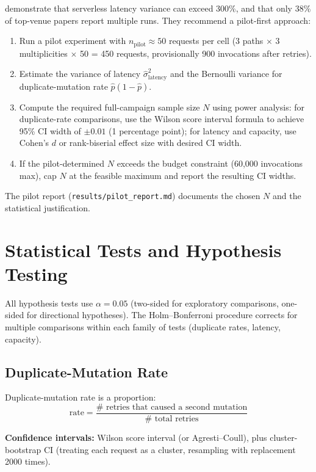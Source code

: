 \citet{Wen2025Variance} demonstrate that serverless latency variance can exceed 300\%, and that only 38\% of top-venue papers report multiple runs. They recommend a pilot-first approach:

\begin{enumerate}
    \item Run a pilot experiment with $n_{\text{pilot}} \approx 50$ requests per cell (3 paths $\times$ 3 multiplicities $\times$ 50 = 450 requests, provisionally 900 invocations after retries).
    \item Estimate the variance of latency $\hat{\sigma}^2_{\text{latency}}$ and the Bernoulli variance for duplicate-mutation rate $\hat{p}(1 - \hat{p})$.
    \item Compute the required full-campaign sample size $N$ using power analysis: for duplicate-rate comparisons, use the Wilson score interval formula to achieve 95\% CI width of $\pm 0.01$ (1 percentage point); for latency and capacity, use Cohen's $d$ or rank-biserial effect size with desired CI width.
    \item If the pilot-determined $N$ exceeds the budget constraint (60,000 invocations max), cap $N$ at the feasible maximum and report the resulting CI widths.
\end{enumerate}

The pilot report (\texttt{results/pilot\_report.md}) documents the chosen $N$ and the statistical justification.

\section{Statistical Tests and Hypothesis Testing}

All hypothesis tests use $\alpha = 0.05$ (two-sided for exploratory comparisons, one-sided for directional hypotheses). The Holm–Bonferroni procedure corrects for multiple comparisons within each family of tests (duplicate rates, latency, capacity).

\subsection{Duplicate-Mutation Rate}

Duplicate-mutation rate is a proportion: \[\text{rate} = \frac{\#\text{ retries that caused a second mutation}}{\#\text{ total retries}}\]

\textbf{Confidence intervals:} Wilson score interval (or Agresti–Coull), plus cluster-bootstrap CI (treating each request as a cluster, resampling with replacement 2000 times).

